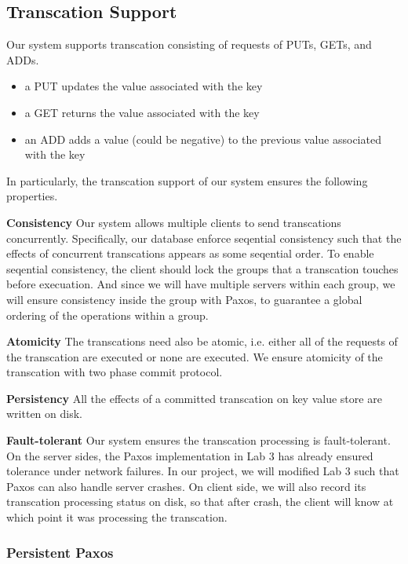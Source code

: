 \documentclass{vldb}
\begin{document}
\subsection{Transcation Support}

Our system supports transcation consisting of requests of PUTs, GETs, and ADDs.
\begin{itemize} 
\item a PUT updates the value associated with the key
\item a GET returns the value associated with the key
\item an ADD adds a value (could be negative) to the previous value associated with
  the key
\end{itemize}

In particularly, the transcation support of our system ensures the following properties. 

\textbf{Consistency} Our system allows multiple clients to send transcations
concurrently. Specifically, our database enforce seqential consistency such that the
effects of concurrent transcations appears as some seqential order. To enable
seqential consistency, the client should lock the groups that a transcation touches
before execuation. And since we will have multiple servers within each group, we will
ensure consistency inside the group with Paxos, to guarantee a global ordering of the
operations within a group.

\textbf{Atomicity} The transcations need also be atomic, i.e. either all of the
requests of the transcation are executed or none are executed. We ensure atomicity of
the transcation with two phase commit protocol.

\textbf{Persistency} All the effects of a committed transcation on key value store
are written on disk.

\textbf{Fault-tolerant} Our system ensures the transcation processing is
fault-tolerant. On the server sides, the Paxos implementation in Lab 3 has already
ensured tolerance under network failures. In our project, we will modified Lab 3 such
that Paxos can also handle server crashes. On client side, we will also record its
transcation processing status on disk, so that after crash, the client will know at
which point it was processing the transcation.

\subsubsection{Persistent Paxos}
\end{document}
